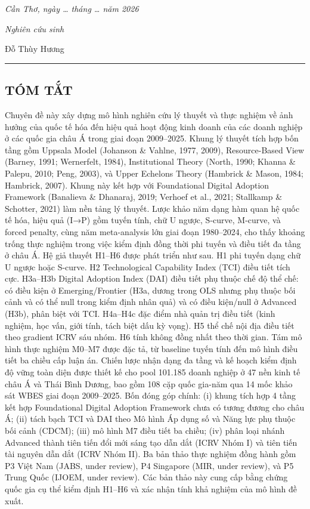 \documentclass[12pt,a4paper]{article}
\begin{document}
\emph{Cần Thơ, ngày \ldots{} tháng \ldots{} năm 2026}

\emph{Nghiên cứu sinh}

Đỗ Thùy Hương

\begin{center}\rule{0.5\linewidth}{0.5pt}\end{center}

\hypertarget{tuxf3m-tux1eaft}{%
\subsection{TÓM TẮT}\label{tuxf3m-tux1eaft}}

Chuyên đề này xây dựng mô hình nghiên cứu lý thuyết và thực nghiệm về
ảnh hưởng của quốc tế hóa đến hiệu quả hoạt động kinh doanh của các
doanh nghiệp ở các quốc gia châu Á trong giai đoạn 2009--2025. Khung lý
thuyết tích hợp bốn tầng gồm Uppsala Model (Johanson \& Vahlne, 1977,
2009), Resource-Based View (Barney, 1991; Wernerfelt, 1984),
Institutional Theory (North, 1990; Khanna \& Palepu, 2010; Peng, 2003),
và Upper Echelons Theory (Hambrick \& Mason, 1984; Hambrick, 2007).
Khung này kết hợp với Foundational Digital Adoption Framework (Banalieva
\& Dhanaraj, 2019; Verhoef et al., 2021; Stallkamp \& Schotter, 2021)
làm nền tảng lý thuyết. Lược khảo năm dạng hàm quan hệ quốc tế hóa, hiệu
quả (I→P) gồm tuyến tính, chữ U ngược, S-curve, M-curve, và forced
penalty, cùng năm meta-analysis lớn giai đoạn 1980--2024, cho thấy
khoảng trống thực nghiệm trong việc kiểm định đồng thời phi tuyến và
điều tiết đa tầng ở châu Á. Hệ giả thuyết H1--H6 được phát triển như
sau. H1 phi tuyến dạng chữ U ngược hoặc S-curve. H2 Technological
Capability Index (TCI) điều tiết tích cực. H3a--H3b Digital Adoption
Index (DAI) điều tiết phụ thuộc chế độ thể chế: có điều kiện ở
Emerging/Frontier (H3a, dương trong OLS nhưng phụ thuộc bối cảnh và có
thể null trong kiểm định nhân quả) và có điều kiện/null ở Advanced
(H3b), phân biệt với TCI. H4a--H4c đặc điểm nhà quản trị điều tiết (kinh
nghiệm, học vấn, giới tính, tách biệt dấu kỳ vọng). H5 thể chế nội địa
điều tiết theo gradient ICRV sáu nhóm. H6 tính không đồng nhất theo thời
gian. Tám mô hình thực nghiệm M0--M7 được đặc tả, từ baseline tuyến tính
đến mô hình điều tiết ba chiều cấp luận án. Chiến lược nhận dạng đa tầng
và kế hoạch kiểm định độ vững toàn diện được thiết kế cho pool 101.185
doanh nghiệp ở 47 nền kinh tế châu Á và Thái Bình Dương, bao gồm 108 cặp
quốc gia-năm qua 14 mốc khảo sát WBES giai đoạn 2009--2025. Bốn đóng góp
chính: (i) khung tích hợp 4 tầng kết hợp Foundational Digital Adoption
Framework chưa có tương đương cho châu Á; (ii) tách bạch TCI và DAI theo
Mô hình Áp dụng số và Năng lực phụ thuộc bối cảnh (CDCM); (iii) mô hình
M7 điều tiết ba chiều; (iv) phân loại nhánh Advanced thành tiên tiến đổi
mới sáng tạo dẫn dắt (ICRV Nhóm I) và tiên tiến tài nguyên dẫn dắt (ICRV
Nhóm II). Ba bản thảo thực nghiệm đồng hành gồm P3 Việt Nam (JABS, under
review), P4 Singapore (MIR, under review), và P5 Trung Quốc (IJOEM,
under review). Các bản thảo này cung cấp bằng chứng quốc gia cụ thể kiểm
định H1--H6 và xác nhận tính khả nghiệm của mô hình đề xuất.
\end{document}
